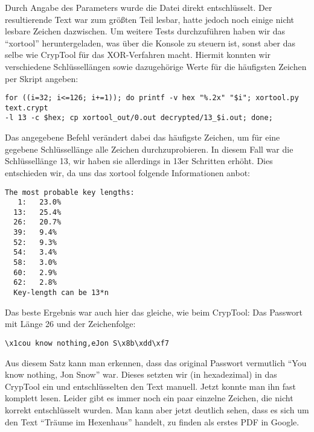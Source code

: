 \documentclass[10pt,a4paper]{article}
\begin{document}
Durch Angabe des Parameters wurde die Datei direkt entschlüsselt. Der resultierende Text war zum größten Teil lesbar, hatte jedoch noch einige nicht lesbare Zeichen dazwischen. Um weitere Tests durchzuführen haben wir das "`xortool"' heruntergeladen, was über die Konsole zu steuern ist, sonst aber das selbe wie CrypTool für das XOR-Verfahren macht. Hiermit konnten wir verschiedene Schlüssellängen sowie dazugehörige Werte für die häufigsten Zeichen per Skript angeben:

\begin{verbatim}
for ((i=32; i<=126; i+=1)); do printf -v hex "%.2x" "$i"; xortool.py text.crypt
-l 13 -c $hex; cp xortool_out/0.out decrypted/13_$i.out; done;
\end{verbatim}

Das angegebene Befehl verändert dabei das häufigste Zeichen, um für eine gegebene Schlüssellänge alle Zeichen durchzuprobieren. In diesem Fall war die Schlüssellänge 13, wir haben sie allerdings in 13er Schritten erhöht. Dies entschieden wir, da uns das xortool folgende Informationen anbot:

\begin{verbatim}
The most probable key lengths:
   1:   23.0%
  13:   25.4%
  26:   20.7%
  39:   9.4%
  52:   9.3%
  54:   3.4%
  58:   3.0%
  60:   2.9%
  62:   2.8%
  Key-length can be 13*n
\end{verbatim}

Das beste Ergebnis war auch hier das gleiche, wie beim CrypTool: Das Passwort mit Länge 26 und der Zeichenfolge:

\begin{verbatim}
\x1cou know nothing,eJon S\x8b\xdd\xf7
\end{verbatim}

Aus diesem Satz kann man erkennen, dass das original Passwort vermutlich "`You know nothing, Jon Snow"' war. Dieses setzten wir (in hexadezimal) in das CrypTool ein und entschlüsselten den Text manuell. Jetzt konnte man ihn fast komplett lesen. Leider gibt es immer noch ein paar einzelne Zeichen, die nicht korrekt entschlüsselt wurden. Man kann aber jetzt deutlich sehen, dass es sich um den Text "`Träume im Hexenhaus"' handelt, zu finden als erstes PDF in Google.
\end{document}
